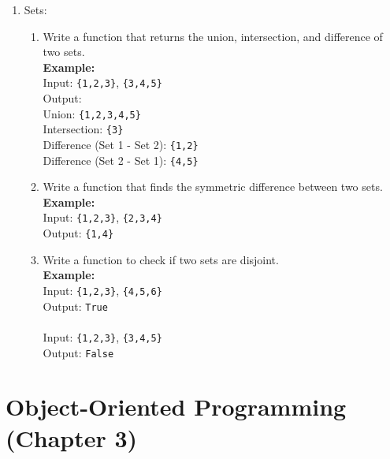 \documentclass{article}
\begin{document}
\begin{enumerate}
        \item Sets:

        \begin{enumerate}
            \item Write a function that returns the union, intersection, and difference of two sets.\\
            \textbf{Example:} \\
            Input: \texttt{\{1,2,3\}}, \texttt{\{3,4,5\}} \\
            Output: \\
            Union: \texttt{\{1,2,3,4,5\}} \\
            Intersection: \texttt{\{3\}} \\
            Difference (Set 1 - Set 2): \texttt{\{1,2\}} \\
            Difference (Set 2 - Set 1): \texttt{\{4,5\}}
            
            \item Write a function that finds the symmetric difference between two sets.\\
            \textbf{Example:} \\
            Input: \texttt{\{1,2,3\}}, \texttt{\{2,3,4\}} \\
            Output: \texttt{\{1,4\}}
            
            \item Write a function to check if two sets are disjoint.\\
            \textbf{Example:} \\
            Input: \texttt{\{1,2,3\}}, \texttt{\{4,5,6\}} \\
            Output: \texttt{True} \\
            \\
            Input: \texttt{\{1,2,3\}}, \texttt{\{3,4,5\}} \\
            Output: \texttt{False}
            
        \end{enumerate}
        
\end{enumerate}

\section*{Object-Oriented Programming (Chapter 3)}
\end{document}
